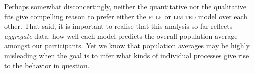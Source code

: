 \documentclass[a4paper, doc, floatsintext]{apa6}
\begin{document}
Perhaps somewhat disconcertingly, neither the quantitative nor the qualitative fits give compelling reason to prefer either the \textsc{rule} or \textsc{limited} model over each other. That said, it is important to realise that this analysis so far reflects \textit{aggregate} data: how well each model predicts the overall population average amongst our participants. Yet we know that population averages may be highly misleading when the goal is to infer what kinds of individual processes give rise to the behavior in question.

\begin{figure}
	\centering
    \captionsetup[subfigure]{justification=centering}
    \begin{subfigure}[b]{0.45\textwidth}


\end{subfigure}
\end{figure}
\end{document}
